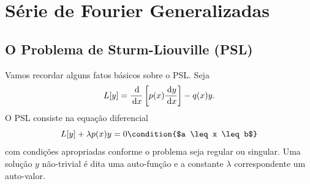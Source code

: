%
%
%
%
%

%

\chapter{Série de Fourier Generalizadas}
\section{O Problema de Sturm-Liouville (PSL)}
Vamos recordar alguns fatos básicos sobre o PSL. Seja
\begin{dmath*}
  L[y] = \frac{\id{}}{\id{x}}\left[ p(x) \frac{\id{y}}{\id{x}} \right] - q(x) y.
\end{dmath*}
O PSL consiste na equação diferencial
\begin{dmath*}
  L[y] + \lambda p(x) y = 0 \condition{$a \leq x \leq b$}
\end{dmath*}
com condições apropriadas conforme o problema seja regular ou singular. Uma
solução $y$ não-trivial é dita uma auto-função e a constante $\lambda$
correspondente um auto-valor.

